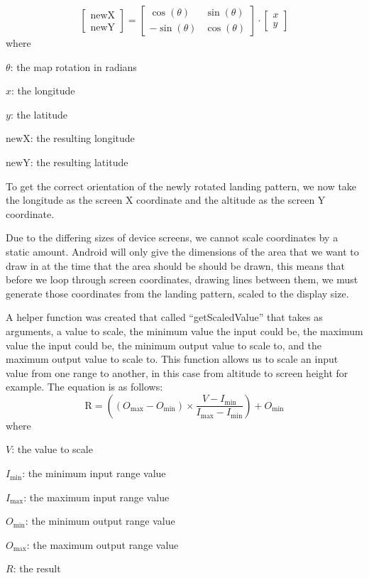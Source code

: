 \begin{equation}\label{eq:matrix-mult}
  \begin{bmatrix}
    \mathrm{newX} \\[0.3em]
    \mathrm{newY}
  \end{bmatrix}
  =
  \begin{bmatrix}
    \cos(\theta)  & \sin(\theta) \\[0.3em]
    -\sin(\theta) & \cos(\theta)
  \end{bmatrix}\cdot
  \begin{bmatrix}
    x \\[0.3em]
    y
  \end{bmatrix}
\end{equation}
where
\begin{description}
  \item $\theta$: the map rotation in radians
  \item $x$: the longitude
  \item $y$: the latitude
  \item $\mathrm{newX}$: the resulting longitude
  \item $\mathrm{newY}$: the resulting latitude
\end{description}

To get the correct orientation of the newly rotated landing pattern, we now take the longitude as the screen X coordinate and the altitude as the screen Y coordinate.

Due to the differing sizes of device screens, we cannot scale coordinates by a static amount. Android will only give the dimensions of the area that we want to draw in at the time that the area should be should be drawn, this means that before we loop through screen coordinates, drawing lines between them, we must generate those coordinates from the landing pattern, scaled to the display size.

A helper function was created that called ``getScaledValue'' that takes as arguments, a value to scale, the minimum value the input could be, the maximum value the input could be, the minimum output value to scale to, and the maximum output value to scale to. This function allows us to scale an input value from one range to another, in this case from altitude to screen height for example. The equation is as follows:
\begin{equation}\label{eq:scale-values}
  \mathrm{R} = \left((O_{\mathrm{max}} - O_{\mathrm{min}}) \times \frac{V - I_{\mathrm{min}}}{I_{\mathrm{max}} - I_{\mathrm{min}}}\right) + O_{\mathrm{min}}
\end{equation}
where
\begin{description}
  \item $V$: the value to scale
  \item $I_{\mathrm{min}}$: the minimum input range value
  \item $I_{\mathrm{max}}$: the maximum input range value
  \item $O_{\mathrm{min}}$: the minimum output range value
  \item $O_{\mathrm{max}}$: the maximum output range value
  \item $R$: the result
\end{description}

